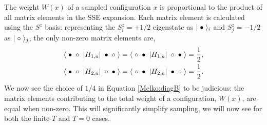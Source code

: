 \documentclass[vecphys]{svmult}
\begin{document}
The weight $W(x)$ of a sampled configuration $x$ is proportional to the product of all matrix elements in the SSE expansion.  Each matrix element is calculated using the $S^z$ basis: representing the $S^z_i=+1/2$ eigenstate as $|\hspace{1mm} \bullet \hspace{1mm} \rangle_i$ and  $S^z_j=-1/2$ as $|\hspace{1mm} \circ \hspace{1mm} \rangle_j$, the only non-zero matrix elements are,
\begin{eqnarray}
\langle \hspace{1mm} \bullet \hspace{1mm}  \circ \hspace{1mm}  | H_{1,a} | \hspace{1mm} \bullet \hspace{1mm} \circ \hspace{1mm} \rangle = 
\langle \hspace{1mm} \circ \hspace{1mm}  \bullet \hspace{1mm}  | H_{1,a} | \hspace{1mm} \circ \hspace{1mm} \bullet \hspace{1mm} \rangle = \frac{1}{2}, \label {Melko:Hdiag} \\
\langle \hspace{1mm} \bullet \hspace{1mm}  \circ \hspace{1mm}  | H_{2,a} | \hspace{1mm} \circ \hspace{1mm} \bullet \hspace{1mm} \rangle =
\langle \hspace{1mm} \circ \hspace{1mm}  \bullet \hspace{1mm}  | H_{2,a} | \hspace{1mm} \bullet \hspace{1mm} \circ \hspace{1mm} \rangle =
\frac{1}{2}. \label{Melko:Hod}
\end{eqnarray} 
We now see the choice of $1/4$ in Equation \ref{Melko:diagB} to be judicious: the matrix elements contributing to the total weight of a configuration, $W(x)$, are equal when non-zero.  This will significantly simplify sampling, we will now see for both the finite-$T$ and $T=0$ cases.
\end{document}
